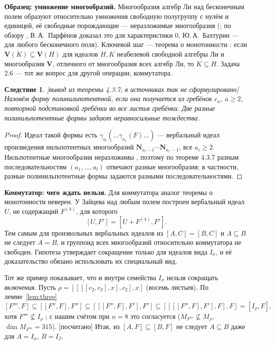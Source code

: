 \documentclass[11pt]{article}
\newcommand{\g}{\gamma}
\newcommand{\stat}[1]{\textsf{\small[#1]}}
\newcommand{\computed}{\stat{посчитано}}
\theoremstyle{plain}
\newtheorem{corollary}[theorem]{Следствие}
\theoremstyle{definition}
\theoremstyle{remark}
\begin{document}
\textbf{Образец: умножение многообразий.} Многообразия алгебр Ли над бесконечным полем образуют относительно умножения свободную полугруппу с нулём и единицей, её свободные порождающие --- неразложимые многообразия (\cite[теорема 4.3.7]{Bah}; по обзору \cite[с.~210]{BO}, В.\,А.~Парфёнов \cite{Par} доказал это для характеристики $0$, Ю.\,А.~Бахтурин \cite{Bah73} --- для любого бесконечного поля). Ключевой шаг --- теорема о монотонности \cite[4.3.3]{Bah}: если $\mathbf V(K)\subseteq\mathbf V(H)$ для идеалов $H,K$ неабелевой свободной алгебры Ли и многообразия $\mathbf V$, отличного от многообразия всех алгебр Ли, то $K\subseteq H$. Задача 2.6 --- тот же вопрос для другой операции, коммутатора.

\begin{corollary}\label{cor:polynil} \stat{вывод из теоремы 4.3.7; в источниках так не сформулировано}
Назовём форму полинильпотентной, если она получается из гребёнок $c_a$, $a\ge2$, повторной подстановкой гребёнки во все листья гребёнки. Две разные полинильпотентные формы задают неравносильные тождества.
\end{corollary}
\begin{proof}
Идеал такой формы есть $\g_{a_l}(\dots\g_{a_1}(F)\dots)$ --- вербальный идеал произведения нильпотентных многообразий $\mathbf N_{a_l-1}\cdots\mathbf N_{a_1-1}$, все $a_i\ge2$. Нильпотентные многообразия неразложимы \cite[п.~4.3.8]{Bah}, поэтому по теореме 4.3.7 разным последовательностям $(a_1,\dots,a_l)$ отвечают разные многообразия; в частности, разные полинильпотентные формы задаются разными последовательностями.
\end{proof}

\textbf{Коммутатор: чего ждать нельзя.} Для коммутатора аналог теоремы о монотонности неверен. У Зайцева \cite[\S\,2]{Z81} над любым полем построен вербальный идеал $U$, не содержащий $F^{(4)}$, для которого
\[ [U,F']=[U+F^{(4)},F']. \]
Тем самым для произвольных вербальных идеалов из $[A,C]=[B,C]$ и $A\subseteq B$ не следует $A=B$, и группоид всех многообразий относительно коммутатора не свободен. Гипотеза утверждает сокращение только для идеалов вида $I_\sigma$, и её доказательство обязано использовать их специальный вид.

Тот же пример показывает, что и внутри семейства $I_\sigma$ нельзя сокращать \emph{включения}. Пусть $\rho=[[[[c_2,c_2],x],c_2],x]$ (восемь листьев). По лемме~\ref{lem:three}
\[ [F''',F]\subseteq[[F'',F],F'']\subseteq[[[F'',F],F'],F']\subseteq[[[[F'',F],F'],F],F]=[I_\rho,F], \]
хотя $F'''\not\subseteq I_\rho$ \cite[\S\,2, предложение~1]{Z81}; с нашим счётом при $n=8$ это согласуется ($M_{F'''}\not\subseteq M_\rho$, $\dim M_{F'''}=315$). \computed{} Итак, из $[A,F]\subseteq[B,F]$ не следует $A\subseteq B$ даже для $A=I_\alpha$, $B=I_\beta$.
\end{document}

